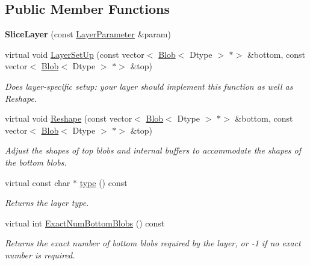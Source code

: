 \subsection*{Public Member Functions}
\begin{DoxyCompactItemize}
\item 
\mbox{\label{classcaffe_1_1_slice_layer_a2d4001e14fba5c1e64595f1d1a05c957}} 
{\bfseries Slice\+Layer} (const \mbox{\hyperlink{classcaffe_1_1_layer_parameter}{Layer\+Parameter}} \&param)
\item 
virtual void \mbox{\hyperlink{classcaffe_1_1_slice_layer_a92c1cdabdce4c92b9a4ee58e2ceb601e}{Layer\+Set\+Up}} (const vector$<$ \mbox{\hyperlink{classcaffe_1_1_blob}{Blob}}$<$ Dtype $>$ $\ast$$>$ \&bottom, const vector$<$ \mbox{\hyperlink{classcaffe_1_1_blob}{Blob}}$<$ Dtype $>$ $\ast$$>$ \&top)
\begin{DoxyCompactList}\small\item\em Does layer-\/specific setup\+: your layer should implement this function as well as Reshape. \end{DoxyCompactList}\item 
virtual void \mbox{\hyperlink{classcaffe_1_1_slice_layer_af9fa49d54abf1cb090cfc772eb4acc4d}{Reshape}} (const vector$<$ \mbox{\hyperlink{classcaffe_1_1_blob}{Blob}}$<$ Dtype $>$ $\ast$$>$ \&bottom, const vector$<$ \mbox{\hyperlink{classcaffe_1_1_blob}{Blob}}$<$ Dtype $>$ $\ast$$>$ \&top)
\begin{DoxyCompactList}\small\item\em Adjust the shapes of top blobs and internal buffers to accommodate the shapes of the bottom blobs. \end{DoxyCompactList}\item 
\mbox{\label{classcaffe_1_1_slice_layer_a61b1bf3326b7aaa1d984bcb8ce692f43}} 
virtual const char $\ast$ \mbox{\hyperlink{classcaffe_1_1_slice_layer_a61b1bf3326b7aaa1d984bcb8ce692f43}{type}} () const
\begin{DoxyCompactList}\small\item\em Returns the layer type. \end{DoxyCompactList}\item 
virtual int \mbox{\hyperlink{classcaffe_1_1_slice_layer_abfc6e86b0b22c156ddc350168cd7757b}{Exact\+Num\+Bottom\+Blobs}} () const
\begin{DoxyCompactList}\small\item\em Returns the exact number of bottom blobs required by the layer, or -\/1 if no exact number is required. \end{DoxyCompactList}\item 

\end{DoxyCompactItemize}
